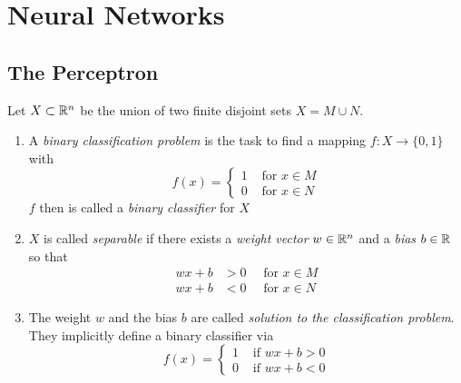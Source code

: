 \newpage
\section{Neural Networks}

\subsection{The Perceptron}
\bigskip

\begin{definition}
    Let \( X \subset \mathbb{R}^n \) be the union of two finite disjoint sets \( X = M \cup N \).
    \begin{enumerate}
        \item A \emph{binary classification problem} is the task to find a mapping \( f: X \to \{ 0, 1 \} \) with
              \[
                  f(x) = \left \{
                  \begin{array}{ll}
                      1 & \text{ for } x \in M \\
                      0 & \text{ for } x \in N
                  \end{array}
                  \right.
              \]
              \( f \) then is called a \emph{binary classifier} for \( X \)
        \item \( X \) is called \emph{separable} if there exists a \emph{weight vector} \( w \in \mathbb{R}^n \)
              and a \emph{bias} \( b \in \mathbb{R} \) so that
              \[
                  \begin{split}
                      wx + b & > 0 \hspace{1em}\text{ for } x \in M \\
                      wx + b & < 0 \hspace{1em}\text{ for } x \in N
                  \end{split}
              \]
        \item The weight \( w \) and the bias \( b \) are called \emph{solution to the classification problem}.
              They implicitly define a binary classifier via
              \[
                  f(x) = \left \{
                  \begin{array}{ll}
                      1 & \text{ if } wx + b > 0 \\
                      0 & \text{ if } wx + b < 0
                  \end{array}
                  \right.
              \]
    \end{enumerate}
\end{definition}
\bigskip


